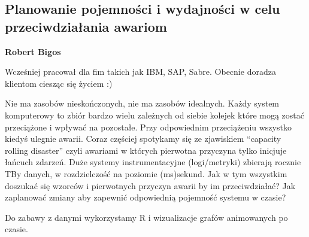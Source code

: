 \documentclass[\main/boa.tex]{subfiles}
\begin{document}
\subsection{Planowanie pojemności i wydajności w celu przeciwdziałania awariom}

\begin{minipage}{0.915\textwidth}
	\centering
  {\bf {} Robert Bigos}
\end{minipage}


\begin{affiliations}
\begin{minipage}{0.915\textwidth}
\centering
Wcześniej pracował dla fim takich jak IBM, SAP, Sabre. Obecnie doradza klientom ciesząc się życiem :)  \\[-2pt]
\end{minipage}
\end{affiliations}

\vskip 0.3cm

 Nie ma zasobów nieskończonych, nie ma zasobów idealnych. Każdy system komputerowy to zbiór bardzo wielu zależnych od siebie kolejek które mogą zostać przeciążone i wpływać na pozostałe. Przy odpowiednim przeciążeniu wszystko kiedyś ulegnie awarii. Coraz częściej spotykamy się ze zjawiskiem “capacity rolling disaster” czyli awariami w których pierwotna przyczyna tylko inicjuje łańcuch zdarzeń. Duże systemy instrumentacyjne (logi/metryki) zbierają rocznie TBy danych, w rozdzielczość na poziomie (ms)sekund. Jak w tym wszystkim doszukać się wzorców i pierwotnych przyczyn awarii by im przeciwdziałać? Jak zaplanować zmiany aby zapewnić odpowiednią pojemność systemu w czasie?
 
 Do zabawy z danymi wykorzystamy R i wizualizacje grafów animowanych po czasie.
 
\end{document}

